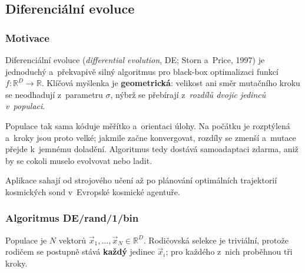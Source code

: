 \documentclass[11pt,a4paper]{article}
\theoremstyle{definition}
\begin{document}
\subsection{Diferenciální evoluce}
\label{sec:de}
\subsubsection{Motivace}

Diferenciální evoluce (\emph{differential evolution}, DE; Storn a~Price, 1997) je jednoduchý
a~překvapivě silný algoritmus pro black-box optimalizaci funkcí
$f: \mathbb{R}^D \to \mathbb{R}$. Klíčová myšlenka je \textbf{geometrická}: velikost ani směr
mutačního kroku se neodhadují z~parametru $\sigma$, nýbrž se přebírají
z~\emph{rozdílů dvojic jedinců v~populaci}.

Populace tak sama kóduje měřítko a~orientaci úlohy. Na počátku je rozptýlená a~kroky jsou
proto velké; jakmile začne konvergovat, rozdíly se zmenší a~mutace přejde k~jemnému doladění.
Algoritmus tedy dostává samoadaptaci zdarma, aniž by se cokoli muselo evolvovat nebo ladit.

Aplikace sahají od strojového učení až po plánování optimálních trajektorií kosmických sond
v~Evropské kosmické agentuře.

\subsubsection{Algoritmus DE/rand/1/bin}

Populace je $N$ vektorů $\vec x_{1},\dots,\vec x_{N} \in \mathbb{R}^D$. Rodičovská selekce
je triviální, protože rodičem se postupně stává \textbf{každý} jedinec $\vec x_i$; pro
každého z~nich proběhnou tři kroky.
\end{document}
